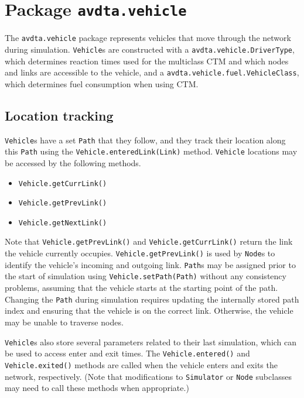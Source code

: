 \chapter{Package \texttt{avdta.vehicle}}

The \texttt{avdta.vehicle} package represents vehicles that move through the network during simulation. \texttt{Vehicle}s are constructed with a \texttt{avdta.vehicle.DriverType}, which determines reaction times used for the multiclass CTM\cite{levin2016multiclass} and which nodes and links are accessible to the vehicle, and a \texttt{avdta.vehicle.fuel.VehicleClass}, which determines fuel consumption when using CTM. 

\section{Location tracking}
\texttt{Vehicle}s have a set \texttt{Path} that they follow, and they track their location along this \texttt{Path} using the \texttt{Vehicle.enteredLink(Link)} method. \texttt{Vehicle} locations may be accessed by the following methods.
\begin{itemize}
	\item \texttt{Vehicle.getCurrLink()}
	\item \texttt{Vehicle.getPrevLink()}
	\item \texttt{Vehicle.getNextLink()}
\end{itemize}
Note that \texttt{Vehicle.getPrevLink()} and \texttt{Vehicle.getCurrLink()} return the link the vehicle currently occupies. \texttt{Vehicle.getPrevLink()} is used by \texttt{Node}s to identify the vehicle's incoming and outgoing link.
%
\texttt{Path}s may be assigned prior to the start of simulation using \texttt{Vehicle.setPath(Path)} without any consistency problems, assuming that the vehicle starts at the starting point of the path. Changing the \texttt{Path} during simulation requires updating the internally stored path index and ensuring that the vehicle is on the correct link. Otherwise, the vehicle may be unable to traverse nodes.

\texttt{Vehicle}s also store several parameters related to their last simulation, which can be used to access enter and exit times. The \texttt{Vehicle.entered()} and \texttt{Vehicle.exited()} methods are called when the vehicle enters and exits the network, respectively. (Note that modifications to \texttt{Simulator} or \texttt{Node} subclasses may need to call these methods when appropriate.) 

